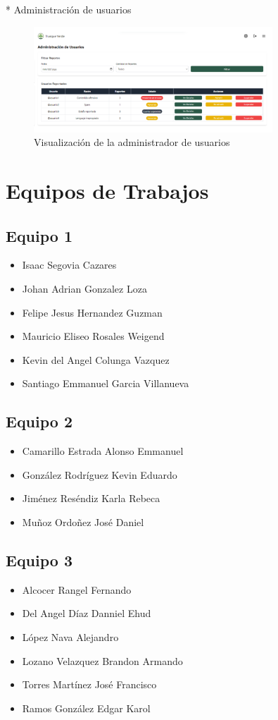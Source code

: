 \documentclass[11pt, a4paper, oneside]{book}
\begin{document}
* Administración de usuarios
\begin{figure}[H]
\centering
\includegraphics[width=0.8\textwidth]{Pictures/Imagen 11.png}
\caption{Visualización de la administrador de usuarios}
\end{figure}

\chapter{Equipos de Trabajos}

\section*{Equipo 1}
\begin{itemize}
    \item Isaac Segovia Cazares
    \item Johan Adrian Gonzalez Loza
    \item Felipe Jesus Hernandez Guzman
    \item Mauricio Eliseo Rosales Weigend
    \item Kevin del Angel Colunga Vazquez
    \item Santiago Emmanuel Garcia Villanueva
\end{itemize}

\section*{Equipo 2}
\begin{itemize}
    \item Camarillo Estrada Alonso Emmanuel
    \item González Rodríguez Kevin Eduardo
    \item Jiménez Reséndiz Karla Rebeca
    \item Muñoz Ordoñez José Daniel
\end{itemize}

\section*{Equipo 3}
\begin{itemize}
    \item Alcocer Rangel Fernando
    \item Del Angel Díaz Danniel Ehud
    \item López Nava Alejandro
    \item Lozano Velazquez Brandon Armando
    \item Torres Martínez José Francisco
    \item Ramos González Edgar Karol
\end{itemize}
\end{document}
